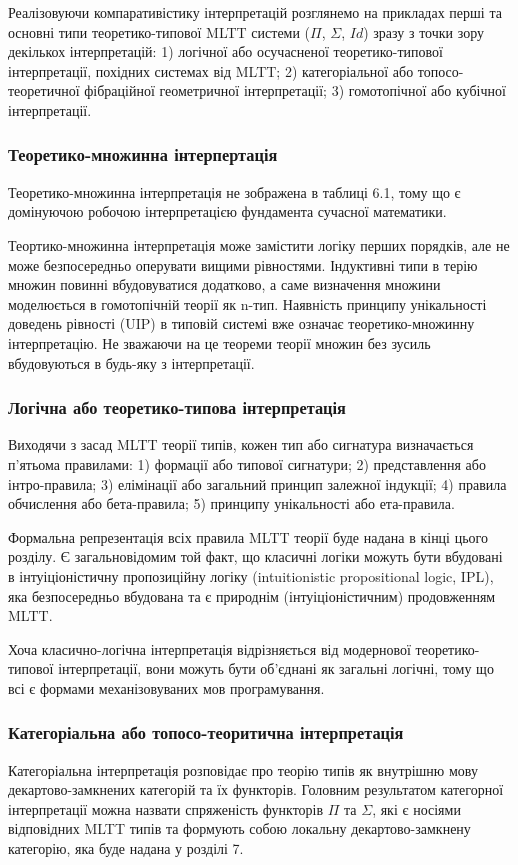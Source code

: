 Реалізовуючи компаративістику інтерпретацій розглянемо на прикладах
перші та основні типи теоретико-типової MLTT системи ($\Pi$, $\Sigma$, $Id$) зразу
з точки зору декількох інтерпретацій:
1) логічної або осучасненої теоретико-типової інтерпретації, похідних системах від MLTT;
2) категоріальної або топосо-теоретичної фібраційної геометричної інтерпретації;
3) гомотопічної або кубічної інтерпретації.

\subsubsection{Теоретико-множинна інтерпертація}
Теоретико-множинна інтерпретація не зображена в таблиці 6.1, тому
що є домінуючою робочою інтерпретацією фундамента сучасної математики.

Теортико-множинна інтерпретація може замістити логіку перших порядків, але не може
безпосередньо оперувати вищими рівностями. Індуктивні типи в терію множин повинні
вбудовуватися додатково, а саме визначення множини моделюється в гомотопічній
теорії як n-тип. Наявність принципу унікальності
доведень рівності (UIP) в типовій системі вже означає теоретико-множинну інтерпретацію.
Не зважаючи на це теореми теорії множин без зусиль вбудовуються
в будь-яку з інтерпретації.

\subsubsection{Логічна або теоретико-типова інтерпретація}
Виходячи з засад MLTT теорії типів, кожен тип або сигнатура визначається
п'ятьома правилами:
1) формації або типової сигнатури;
2) представлення або інтро-правила;
3) елімінації або загальний принцип залежної індукції;
4) правила обчислення або бета-правила;
5) принципу унікальності або ета-правила.

Формальна репрезентація всіх правила MLTT теорії буде надана в кінці цього розділу.
Є загальновідомим той факт, що класичні логіки можуть бути вбудовані в інтуіціоністичну
пропозиційну логіку (intuitionistic propositional logic, IPL), яка безпосередньо
вбудована та є природнім (інтуіціоністичним) продовженням MLTT.

Хоча класично-логічна інтерпретація відрізняється від модернової теоретико-типової
інтерпретації, вони можуть бути об'єднані як загальні логічні, тому що всі є
формами механізовуваних мов програмування.

\subsubsection{Категоріальна або топосо-теоритична інтерпретація}
Категоріальна інтерпретація розповідає про теорію типів як внутрішню мову
декартово-замкнених категорій та їх функторів. Головним результатом
категорної інтерпретації можна назвати спряженість функторів $\Pi$ та $\Sigma$,
які є носіями відповідних MLTT типів та формують собою локальну
декартово-замкнену категорію, яка буде надана у розділі 7.


